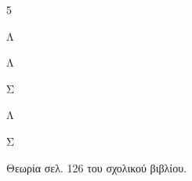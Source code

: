 
\begin{alist}
\item
\begin{multicols}{5}
\begin{rlist}
\item Λ
\item Λ
\item Σ
\item Λ
\item Σ
\end{rlist}
\end{multicols}
\item Θεωρία σελ. 126 του σχολικού βιβλίου.
\end{alist}

